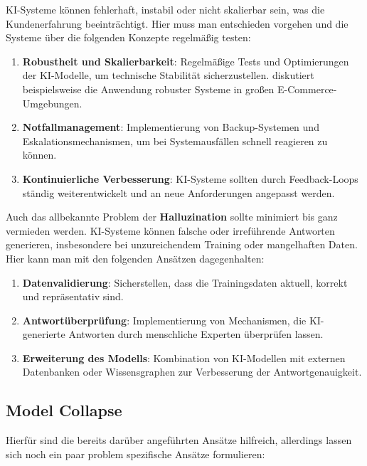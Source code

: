 \documentclass[12pt]{article}
\begin{document}
KI-Systeme können fehlerhaft, instabil oder nicht skalierbar sein, was die Kundenerfahrung beeinträchtigt. Hier muss man entschieden vorgehen und die Systeme über die folgenden Konzepte regelmäßig testen: 

\begin{enumerate}
    \item \textbf{Robustheit und Skalierbarkeit}: Regelmäßige Tests und Optimierungen der KI-Modelle, um technische Stabilität sicherzustellen. \cite{fu2020icsassistintelligentcustomerinquiry} diskutiert beispielsweise die Anwendung robuster Systeme in großen E-Commerce-Umgebungen.
    \item \textbf{Notfallmanagement}: Implementierung von Backup-Systemen und Eskalationsmechanismen, um bei Systemausfällen schnell reagieren zu können.
    \item \textbf{Kontinuierliche Verbesserung}: KI-Systeme sollten durch Feedback-Loops ständig weiterentwickelt und an neue Anforderungen angepasst werden.
\end{enumerate}

Auch das allbekannte Problem der \textbf{Halluzination} sollte minimiert bis ganz vermieden werden. KI-Systeme können falsche oder irreführende Antworten generieren, insbesondere bei unzureichendem Training oder mangelhaften Daten. Hier kann man mit den folgenden Ansätzen dagegenhalten:

\begin{enumerate}
    \item \textbf{Datenvalidierung}: Sicherstellen, dass die Trainingsdaten aktuell, korrekt und repräsentativ sind.
    \item \textbf{Antwortüberprüfung}: Implementierung von Mechanismen, die KI-generierte Antworten durch menschliche Experten überprüfen lassen.
    \item \textbf{Erweiterung des Modells}: Kombination von KI-Modellen mit externen Datenbanken oder Wissensgraphen zur Verbesserung der Antwortgenauigkeit.
\end{enumerate}

\subsection{Model Collapse}
Hierfür sind die bereits darüber angeführten Ansätze hilfreich, allerdings lassen sich noch ein paar problem spezifische Ansätze formulieren:
\end{document}
